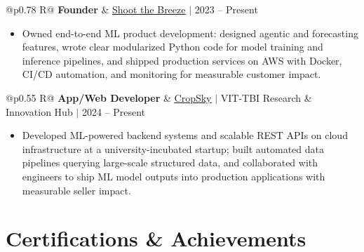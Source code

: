 \documentclass[a4paper,10pt]{article}
\newcommand{\ulink}[2]{\href{#1}{\uline{#2}}}
\newcommand{\subheading}[1]{{\color[HTML]{0A0A0A}\fontsize{12}{14}\selectfont\bfseries #1}}
\newcommand{\meta}[1]{{\color[HTML]{5C5C5C}\fontsize{10.5}{12.5}\selectfont #1}}
\begin{document}
\begin{tabularx}{\linewidth}{@{}p{0.78\linewidth} R@{}}
\subheading{Founder} & \meta{\ulink{https://shoot-the-breeze.vercel.app}{Shoot the Breeze} $|$ 2023 -- Present}
\end{tabularx}
\begin{itemize}[nosep, leftmargin=1.5em, itemsep=1pt, topsep=2pt]
\item {\color[HTML]{0A0A0A}\fontsize{11}{14}\selectfont
Owned end-to-end ML product development: designed agentic and forecasting features, wrote clear modularized Python code for model training and inference pipelines, and shipped production services on AWS with Docker, CI/CD automation, and monitoring for measurable customer impact.}
\end{itemize}

\vspace{2pt}

\begin{tabularx}{\linewidth}{@{}p{0.55\linewidth} R@{}}
\subheading{App/Web Developer} & \meta{\ulink{https://sites.google.com/view/cropsky/home}{CropSky} $|$ VIT-TBI Research \& Innovation Hub $|$ 2024 -- Present}
\end{tabularx}
\begin{itemize}[nosep, leftmargin=1.5em, itemsep=1pt, topsep=2pt]
\item {\color[HTML]{0A0A0A}\fontsize{11}{14}\selectfont
Developed ML-powered backend systems and scalable REST APIs on cloud infrastructure at a university-incubated startup; built automated data pipelines querying large-scale structured data, and collaborated with engineers to ship ML model outputs into production applications with measurable seller impact.}
\end{itemize}

\vspace{2pt}

\section{Certifications \& Achievements}
\vspace{2pt}
\end{document}
